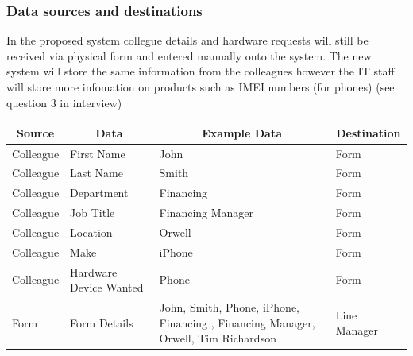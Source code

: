 \subsubsection{Data sources and destinations}

In the proposed system collegue details and hardware requests will still be received via physical form and entered manually onto the system. The new system will store the same information from the colleagues however the IT staff will store more infomation on products such as IMEI numbers (for phones) (see question 3 in interview)

\begin{longtable}{|p{3cm}|p{3cm}|p{3cm}|p{3cm}|}
\hline
\multicolumn{1}{|c|}{\textbf{Source}} & \multicolumn{1}{c|}{\textbf{Data}} & \multicolumn{1}{c|}{\textbf{Example Data}}         & \multicolumn{1}{c|}{\textbf{Destination}} \\ \hline
Colleague                             & First Name                         & John                                               & Form                                      \\ \hline
Colleague                             & Last Name                          & Smith                                              & Form                                      \\ \hline
Colleague                             & Department                              & Financing                                            & Form                                      \\ \hline
Colleague                             & Job Title                              & Financing Manager                                          & Form                                      \\ \hline
Colleague                             & Location                              & Orwell                                            & Form                                      \\ \hline
Colleague                             & Make                              & iPhone                                             & Form                                      \\ \hline
Colleague                             & Hardware Device Wanted             & Phone                                              & Form                                      \\ \hline
Form                                  & Form Details                       & John, Smith, Phone, iPhone, Financing , Financing Manager, Orwell, Tim Richardson             & Line Manager                              \\ \hline

\end{longtable}
